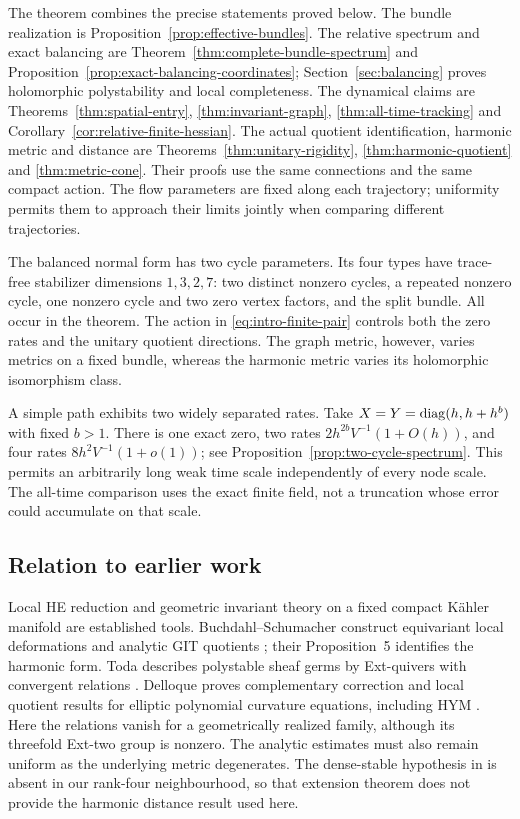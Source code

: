 The theorem combines the precise statements proved below.
The bundle realization is Proposition~\ref{prop:effective-bundles}.
The relative spectrum and exact balancing are
Theorem~\ref{thm:complete-bundle-spectrum} and
Proposition~\ref{prop:exact-balancing-coordinates};
Section~\ref{sec:balancing} proves holomorphic
polystability and local completeness. The dynamical
claims are Theorems~\ref{thm:spatial-entry},
\ref{thm:invariant-graph}, \ref{thm:all-time-tracking}
and Corollary~\ref{cor:relative-finite-hessian}.
The actual quotient identification, harmonic metric and
distance are Theorems~\ref{thm:unitary-rigidity},
\ref{thm:harmonic-quotient} and \ref{thm:metric-cone}.
Their proofs use the same connections and the same
compact action. The flow parameters are fixed along
each trajectory; uniformity permits them to approach
their limits jointly when comparing different trajectories.

The balanced normal form has two cycle parameters.
Its four types have trace-free stabilizer dimensions
$1,3,2,7$: two distinct nonzero cycles, a repeated
nonzero cycle, one nonzero cycle and two zero vertex
factors, and the split bundle. All occur in the theorem.
The action in \eqref{eq:intro-finite-pair} controls
both the zero rates and the unitary quotient directions.
The graph metric, however, varies metrics on a fixed
bundle, whereas the harmonic metric varies its
holomorphic isomorphism class.

A simple path exhibits two widely separated rates.
Take $X=Y=\operatorname{diag}(h,h+h^b)$ with fixed $b>1$.
There is one exact zero, two rates
$2h^{2b}V^{-1}(1+O(h))$, and four rates
$8h^2V^{-1}(1+o(1))$; see
Proposition~\ref{prop:two-cycle-spectrum}.
This permits an arbitrarily long weak time scale
independently of every node scale. The all-time
comparison uses the exact finite field, not a
truncation whose error could accumulate on that scale.

\subsection{Relation to earlier work}

Local HE reduction and geometric invariant theory on a
fixed compact Kähler manifold are established tools.
Buchdahl--Schumacher construct equivariant local
deformations and analytic GIT quotients
\cite[Theorems 5--8]{BS}; their Proposition~5 identifies
the harmonic form. Toda describes polystable sheaf
germs by Ext-quivers with convergent relations
\cite[Theorem 3.2]{Toda}. Delloque proves complementary
correction and local quotient results for elliptic
polynomial curvature equations, including HYM
\cite[Propositions 4.3 and 4.5 and Theorem 7.4]{Delloque}.
Here the relations vanish for a geometrically realized
family, although its threefold Ext-two group is nonzero.
The analytic estimates must also remain uniform as the
underlying metric degenerates. The dense-stable
hypothesis in \cite[Theorem 10]{BS} is absent in our
rank-four neighbourhood, so that extension theorem
does not provide the harmonic distance result used here.

